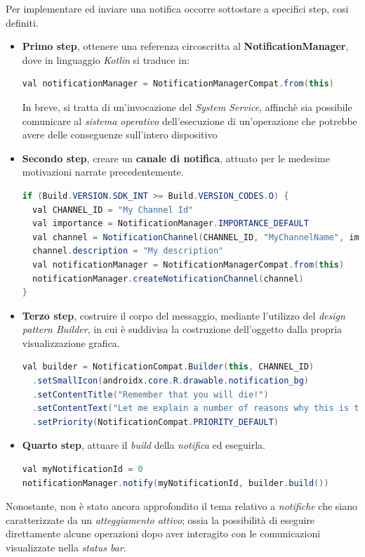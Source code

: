 \documentclass{article}
\begin{document}
Per implementare ed inviare una notifica occorre sottostare a specifici step, cosi definiti.
\begin{itemize}[label={-}]
  \itemsep0em
  \item \textbf{Primo step}, ottenere una referenza circoscritta al \textbf{NotificationManager}, dove in linguaggio \textit{Kotlin} si traduce in:
  \begin{lstlisting}[language=JAVA]
val notificationManager = NotificationManagerCompat.from(this)
  \end{lstlisting}
  In breve, si tratta di un'invocazione del \textit{System Service}, affinchè sia possibile comunicare al \textit{sistema operativo} dell'esecuzione di un'operazione che potrebbe avere delle conseguenze sull'intero dispositivo
  \item \textbf{Secondo step}, creare un \textbf{canale di notifica}, attuato per le medesime motivazioni narrate precedentemente.
  \begin{lstlisting}[language=JAVA]
if (Build.VERSION.SDK_INT >= Build.VERSION_CODES.O) {
  val CHANNEL_ID = "My Channel Id"
  val importance = NotificationManager.IMPORTANCE_DEFAULT
  val channel = NotificationChannel(CHANNEL_ID, "MyChannelName", importance)
  channel.description = "My description"
  val notificationManager = NotificationManagerCompat.from(this)
  notificationManager.createNotificationChannel(channel)
}
  \end{lstlisting}
  \item \textbf{Terzo step}, costruire il corpo del messaggio, mediante l'utilizzo del \textit{design pattern Builder}, in cui è suddivisa la costruzione dell'oggetto dalla propria visualizzazione grafica.
  \begin{lstlisting}[language=JAVA]
val builder = NotificationCompat.Builder(this, CHANNEL_ID)
  .setSmallIcon(androidx.core.R.drawable.notification_bg)
  .setContentTitle("Remember that you will die!")
  .setContentText("Let me explain a number of reasons why this is the case, blah, blah, blah...")
  .setPriority(NotificationCompat.PRIORITY_DEFAULT)
  \end{lstlisting}
  \item \textbf{Quarto step}, attuare il \textit{build} della \textit{notifica} ed eseguirla.
  \begin{lstlisting}[language=JAVA]
val myNotificationId = 0
notificationManager.notify(myNotificationId, builder.build())
  \end{lstlisting}
\end{itemize}
Nonostante, non è stato ancora approfondito il tema relativo a \textit{notifiche} che siano caratterizzate da un \textit{atteggiamento attivo}; ossia la possibilità di eseguire direttamente alcune operazioni dopo aver interagito con le comunicazioni visualizzate nella \textit{status bar}.\vspace*{7pt}\\
\end{document}
